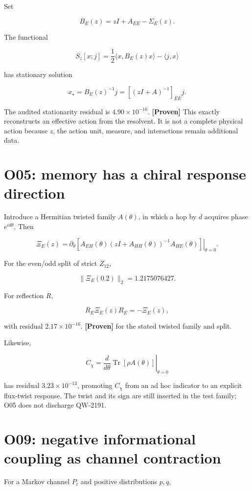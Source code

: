 \documentclass[11pt,a4paper,openany]{report}
\newcommand{\statusProven}{\textcolor{fingreen}{[Proven]}}
\begin{document}
Set

\[
B_E(z)=zI+A_{EE}-\Sigma_E(z).
\]

The functional

\[
S_z[x;j]=\frac12\langle x,B_E(z)x\rangle-\langle j,x\rangle
\]

has stationary solution

\[
x_\star=B_E(z)^{-1}j
=\left[(zI+A)^{-1}\right]_{EE}j.
\]

The audited stationarity residual is \(4.90\times10^{-16}\). \textbf{\statusProven{}} This exactly reconstructs an effective action from the resolvent. It is not a complete physical action because \(z\), the action unit, measure, and interactions remain additional data.

\section{O05: memory has a chiral response direction}

Introduce a Hermitian twisted family \(A(\theta)\), in which a hop by \(d\) acquires phase \(e^{id\theta}\). Then

\[
\Xi_E(z)=
\left.\partial_\theta
\left[
A_{EH}(\theta)(zI+A_{HH}(\theta))^{-1}A_{HE}(\theta)
\right]\right|_{\theta=0}.
\]

For the even/\allowbreak{}odd split of strict \(Z_{12}\),

\[
\|\Xi_E(0.2)\|_2=1.2175076427.
\]

For reflection \(R\),

\[
R_E\Xi_E(z)R_E=-\Xi_E(z),
\]

with residual \(2.17\times10^{-16}\). \textbf{\statusProven{}} for the stated twisted family and split.

Likewise,

\[
C_\chi=
\left.\frac{d}{d\theta}\operatorname{Tr}[\rho A(\theta)]
\right|_{\theta=0}
\]

has residual \(3.23\times10^{-13}\), promoting \(C_\chi\) from an ad hoc indicator to an explicit flux-twist response. The twist and its sign are still inserted in the test family; O05 does not discharge QW-2191.

\section{O09: negative informational coupling as channel contraction}

For a Markov channel \(P_t\) and positive distributions \(p,q\),
\end{document}
